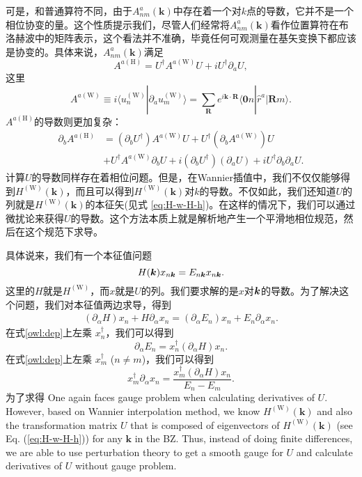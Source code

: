 可是，和普通算符不同，由于$A_{nm}^{a}(\mathbf{k})$中存在着一个对$k$点的导数，它并不是一个相位协变的量。这个性质提示我们，尽管人们经常将$A_{nm}^{a}(\mathbf{k})$看作位置算符在布洛赫波中的矩阵表示，这个看法并不准确，毕竟任何可观测量在基矢变换下都应该是协变的。具体来说，$A_{nm}^{a}(\mathbf{k})$满足\cite{wang_textitab_2006} 
\begin{equation}
A^{a(\textrm{H})}=U^{\dagger}A^{a(\textrm{W})}U+iU^{\dagger}\partial_{a}U,\label{eq:A-H-A-W}
\end{equation}
这里
\begin{equation}
A^{a(\textrm{W})}\equiv i\langle u_{n}^{(\textrm{W})}|\partial_{a}u_{m}^{(\textrm{W})}\rangle=\sum_{\mathbf{R}}e^{i\mathbf{k}\cdot\mathbf{R}}\langle\mathbf{0}n|\hat{r}^{a}|\mathbf{R}m\rangle.
\end{equation}
$A^{a(\textrm{H})}$的导数则更加复杂：
\begin{align}
\partial_{b}A^{a(\textrm{H})} & =(\partial_{b}U^{\dagger})A^{a(\textrm{W})}U+U^{\dagger}(\partial_{b}A^{a(\textrm{W})})U\\
& +U^{\dagger}A^{a(\textrm{W})}\partial_{b}U+i(\partial_{b}U^{\dagger})(\partial_{a}U)+iU^{\dagger}\partial_{b}\partial_{a}U.
\end{align}
计算$U$的导数同样存在着相位问题。但是，在Wannier插值中，我们不仅仅能够得到$H^{(\textrm{W})}(\mathbf{k})$，而且可以得到$H^{(\textrm{W})}(\mathbf{k})$对$k$的导数。不仅如此，我们还知道$U$的列就是$H^{(\textrm{W})}(\mathbf{k})$的本征矢(见式 \ref{eq:H-w-H-h})。在这样的情况下，我们可以通过微扰论来获得$U$的导数。这个方法本质上就是解析地产生一个平滑地相位规范，然后在这个规范下求导。

具体说来，我们有一个本征值问题
\begin{equation}
H(\boldsymbol{k})x_{n\boldsymbol{k}} = E_{n\boldsymbol{k}}x_{n\boldsymbol{k}}.
\end{equation}
这里的$H$就是$H^{\mathrm{(W)}}$，而$x$就是$U$的列。我们要求解的是$x$对$\boldsymbol{k}$的导数。为了解决这个问题，我们对本征值两边求导，得到
\begin{align}
(\partial_\alpha H) x_n+H \partial_\alpha x_n = (\partial_\alpha E_n) x_n + E_n \partial_\alpha x_n.\label{owl:dep}
\end{align}
在式\ref{owl:dep}上左乘 $x_n^\dagger$，我们可以得到
\begin{equation}
\partial_\alpha E_{n}=x_{n}^{\dagger}(\partial_\alpha H) x_{n}.
\end{equation}
在式\ref{owl:dep}上左乘 $x_m^\dagger$ ($n\ne m$)，我们可以得到
\begin{equation}
x_{m}^{\dagger}\partial_\alpha x_{n}=\frac{x_{m}^{\dagger}(\partial_\alpha H)x_{n}}{E_n-E_m}.
\end{equation}
为了求得
One again faces gauge problem when calculating derivatives of $U$. However, based on Wannier interpolation method, we know $H^{(\textrm{W})}(\mathbf{k})$ and also the transformation matrix $U$ that is composed of eigenvectors of $H^{(\textrm{W})}(\mathbf{k})$ (see Eq. (\ref{eq:H-w-H-h})) for any $\mathbf{k}$ in the BZ. Thus, instead of doing finite differences, we are able to use perturbation theory to get a smooth gauge for $U$ and calculate derivatives of  $U$ without gauge problem. 

